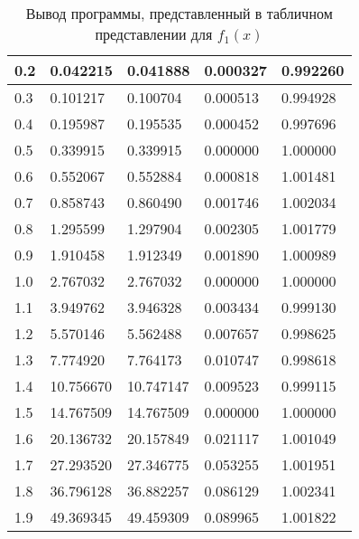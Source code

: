 \documentclass[13pt, a4paper, twoside]{article}
\begin{document}
\begin{table}[!ht]
\begin{tabular}{|l|l|l|l|l|}
        0.2 & 0.042215 & 0.041888 & 0.000327 & 0.992260 \\ \hline
        0.3 & 0.101217 & 0.100704 & 0.000513 & 0.994928 \\ \hline
        0.4 & 0.195987 & 0.195535 & 0.000452 & 0.997696 \\ \hline
        0.5 & 0.339915 & 0.339915 & 0.000000 & 1.000000 \\ \hline
        0.6 & 0.552067 & 0.552884 & 0.000818 & 1.001481 \\ \hline
        0.7 & 0.858743 & 0.860490 & 0.001746 & 1.002034 \\ \hline
        0.8 & 1.295599 & 1.297904 & 0.002305 & 1.001779 \\ \hline
        0.9 & 1.910458 & 1.912349 & 0.001890 & 1.000989 \\ \hline
        1.0 & 2.767032 & 2.767032 & 0.000000 & 1.000000 \\ \hline
        1.1 & 3.949762 & 3.946328 & 0.003434 & 0.999130 \\ \hline
        1.2 & 5.570146 & 5.562488 & 0.007657 & 0.998625 \\ \hline
        1.3 & 7.774920 & 7.764173 & 0.010747 & 0.998618 \\ \hline
        1.4 & 10.756670 & 10.747147 & 0.009523 & 0.999115 \\ \hline
        1.5 & 14.767509 & 14.767509 & 0.000000 & 1.000000 \\ \hline
        1.6 & 20.136732 & 20.157849 & 0.021117 & 1.001049 \\ \hline
        1.7 & 27.293520 & 27.346775 & 0.053255 & 1.001951 \\ \hline
        1.8 & 36.796128 & 36.882257 & 0.086129 & 1.002341 \\ \hline
        1.9 & 49.369345 & 49.459309 & 0.089965 & 1.001822 \\ \hline
    \end{tabular}
    \caption{Вывод программы, представленный в табличном представлении для $f_1(x)$}
\end{table}
\end{document}
